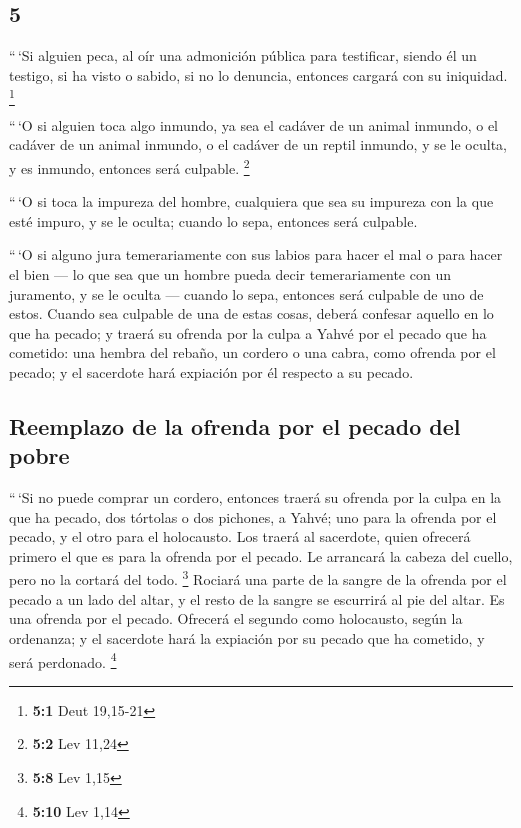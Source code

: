\begin{paracol}{2}
\hypertarget{section-8}{%
\section{5}\label{section-8}}

 ``\,`Si alguien peca, al oír una admonición pública para
testificar, siendo él un testigo, si ha visto o sabido, si no lo
denuncia, entonces cargará con su iniquidad. \footnote{\textbf{5:1} Deut
  19,15-21}

 ``\,`O si alguien toca algo inmundo, ya sea el cadáver de
un animal inmundo, o el cadáver de un animal inmundo, o el cadáver de un
reptil inmundo, y se le oculta, y es inmundo, entonces será culpable.
\footnote{\textbf{5:2} Lev 11,24}

 ``\,`O si toca la impureza del hombre, cualquiera que sea
su impureza con la que esté impuro, y se le oculta; cuando lo sepa,
entonces será culpable.

 ``\,`O si alguno jura temerariamente con sus labios para
hacer el mal o para hacer el bien --- lo que sea que un hombre pueda
decir temerariamente con un juramento, y se le oculta --- cuando lo
sepa, entonces será culpable de uno de estos.  Cuando sea
culpable de una de estas cosas, deberá confesar aquello en lo que ha
pecado;  y traerá su ofrenda por la culpa a Yahvé por el
pecado que ha cometido: una hembra del rebaño, un cordero o una cabra,
como ofrenda por el pecado; y el sacerdote hará expiación por él
respecto a su pecado.

\hypertarget{reemplazo-de-la-ofrenda-por-el-pecado-del-pobre}{%
\subsection{Reemplazo de la ofrenda por el pecado del
pobre}\label{reemplazo-de-la-ofrenda-por-el-pecado-del-pobre}}

 ``\,`Si no puede comprar un cordero, entonces traerá su
ofrenda por la culpa en la que ha pecado, dos tórtolas o dos pichones, a
Yahvé; uno para la ofrenda por el pecado, y el otro para el holocausto.
 Los traerá al sacerdote, quien ofrecerá primero el que es
para la ofrenda por el pecado. Le arrancará la cabeza del cuello, pero
no la cortará del todo. \footnote{\textbf{5:8} Lev 1,15} 
Rociará una parte de la sangre de la ofrenda por el pecado a un lado del
altar, y el resto de la sangre se escurrirá al pie del altar. Es una
ofrenda por el pecado.  Ofrecerá el segundo como
holocausto, según la ordenanza; y el sacerdote hará la expiación por su
pecado que ha cometido, y será perdonado. \footnote{\textbf{5:10} Lev
  1,14}


\end{paracol}
